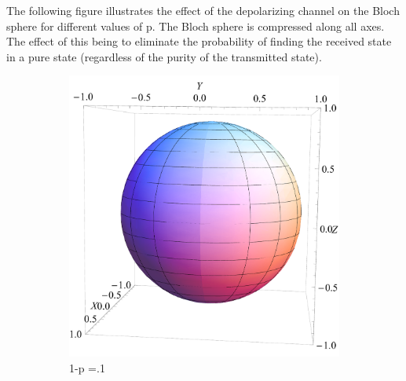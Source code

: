 \documentclass[letterpaper,twoside,10pt]{article}
\begin{document}
The following figure illustrates the effect of the depolarizing channel on the Bloch sphere for different values of p. The Bloch sphere is compressed along all axes. The effect of this being to eliminate the probability of finding the received state in a pure state (regardless of the purity of the transmitted state).


\begin{figure}[H]%
\centering
	\begin{subfigure}{.3\textwidth}
		\includegraphics[width=\columnwidth,natwidth=550,natheight=550]{./Depolarizing/DepolarizingPoint1.pdf}%
		\caption{1-p =.1}%
	\end{subfigure}
	\begin{subfigure}{.3\textwidth}

\end{subfigure}
\end{figure}
\end{document}
